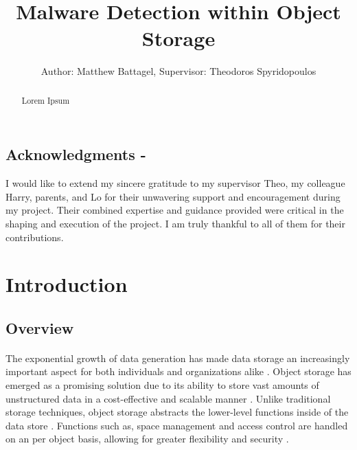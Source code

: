 \documentclass[12pt, conference, final, a4paper, onecolumn, compsoc]{IEEEtran}
\begin{document}
\title{Malware Detection within Object Storage} \author{Author: Matthew
  Battagel, Supervisor: Theodoros Spyridopoulos} 
\maketitle{}

\subsection*{Acknowledgments - }

I would like to extend my sincere gratitude to my supervisor Theo, my colleague
Harry, parents, and Lo for their unwavering support and encouragement during my
project. Their combined expertise and guidance provided were critical in the
shaping and execution of the project. I am truly thankful to all of them for
their contributions.

\bigskip

\begin{abstract}
  Lorem Ipsum
\end{abstract}

\pagebreak

\tableofcontents{}

\section{Introduction}
\subsection{Overview}
\paragraph{}
The exponential growth of data generation has made data storage an increasingly
important aspect for both individuals and organizations alike
\citep{data-storage}. Object storage has emerged as a promising solution due to
its ability to store vast amounts of unstructured data in a cost-effective and
scalable manner \citep{object-storage-market}. Unlike traditional storage
techniques, object storage abstracts the lower-level functions inside of the
data store \citep{object-storage}. Functions such as, space management and
access control are handled on an per object basis, allowing for greater
flexibility and security \citep{object-storage}.
\end{document}
